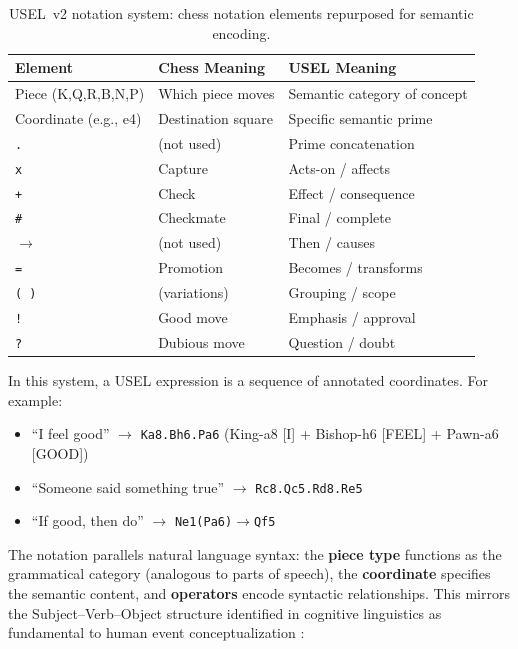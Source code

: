 \documentclass[11pt,a4paper]{article}
\begin{document}
\begin{table}[h!]
\centering
\caption{USEL~v2 notation system: chess notation elements repurposed for semantic encoding.}
\label{tab:notation}
\small
\begin{tabular}{lll}
\toprule
\textbf{Element} & \textbf{Chess Meaning} & \textbf{USEL Meaning} \\
\midrule
Piece (K,Q,R,B,N,P) & Which piece moves & Semantic category of concept \\
Coordinate (e.g., e4) & Destination square & Specific semantic prime \\
\texttt{.} & (not used) & Prime concatenation \\
\texttt{x} & Capture & Acts-on / affects \\
\texttt{+} & Check & Effect / consequence \\
\texttt{\#} & Checkmate & Final / complete \\
\texttt{$\rightarrow$} & (not used) & Then / causes \\
\texttt{=} & Promotion & Becomes / transforms \\
\texttt{( )} & (variations) & Grouping / scope \\
\texttt{!} & Good move & Emphasis / approval \\
\texttt{?} & Dubious move & Question / doubt \\
\bottomrule
\end{tabular}
\end{table}

In this system, a USEL expression is a sequence of annotated coordinates. For example:
\begin{itemize}[nosep]
    \item ``I feel good'' $\rightarrow$ \texttt{Ka8.Bh6.Pa6} (King-a8 [I] + Bishop-h6 [FEEL] + Pawn-a6 [GOOD])
    \item ``Someone said something true'' $\rightarrow$ \texttt{Rc8.Qc5.Rd8.Re5}
    \item ``If good, then do'' $\rightarrow$ \texttt{Ne1(Pa6)$\rightarrow$Qf5}
\end{itemize}

The notation parallels natural language syntax: the \textbf{piece type} functions as the grammatical category (analogous to parts of speech), the \textbf{coordinate} specifies the semantic content, and \textbf{operators} encode syntactic relationships. This mirrors the Subject--Verb--Object structure identified in cognitive linguistics as fundamental to human event conceptualization \citep{talmy2000toward, goldberg1995constructions}:
\end{document}
